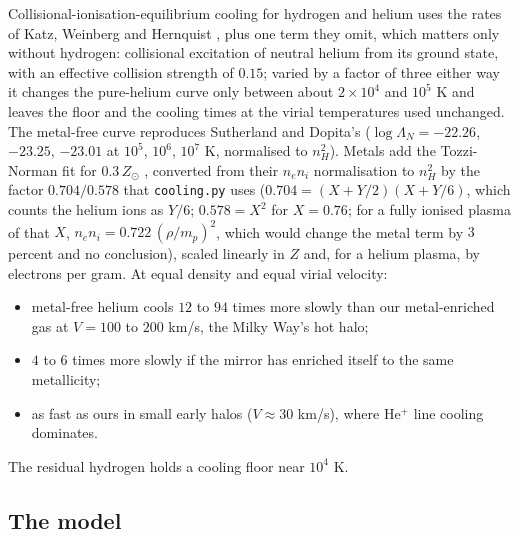 \documentclass[11pt]{article}
\theoremstyle{definition}
\newcommand{\file}[1]{\texttt{#1}}
\begin{document}
Collisional-ionisation-equilibrium cooling for hydrogen and helium uses the rates of Katz, Weinberg and Hernquist \cite{KWH1996}, plus one term they omit, which matters only without hydrogen: collisional excitation of neutral helium from its ground state, with an effective collision strength of $0.15$; varied by a factor of three either way it changes the pure-helium curve only between about $2 \times 10^{4}$ and $10^{5}$ K and leaves the floor and the cooling times at the virial temperatures used unchanged. The metal-free curve reproduces Sutherland and Dopita's \cite{SutherlandDopita1993} ($\log\Lambda_{N} = -22.26$, $-23.25$, $-23.01$ at $10^{5}$, $10^{6}$, $10^{7}$ K, normalised to $n_{H}^{2}$). Metals add the Tozzi-Norman fit for $0.3\,Z_{\odot}$ \cite{TozziNorman2001}, converted from their $n_{e}n_{i}$ normalisation to $n_{H}^{2}$ by the factor $0.704/0.578$ that \file{cooling.py} uses ($0.704 = (X + Y/2)(X + Y/6)$, which counts the helium ions as $Y/6$; $0.578 = X^{2}$ for $X = 0.76$; for a fully ionised plasma of that $X$, $n_{e}n_{i} = 0.722\,(\rho/m_{p})^{2}$, which would change the metal term by $3$ percent and no conclusion), scaled linearly in $Z$ and, for a helium plasma, by electrons per gram. At equal density and equal virial velocity:
\begin{itemize}
\item metal-free helium cools $12$ to $94$ times more slowly than our metal-enriched gas at $V = 100$ to $200$ km/s, the Milky Way's hot halo;
\item $4$ to $6$ times more slowly if the mirror has enriched itself to the same metallicity;
\item as fast as ours in small early halos ($V \approx 30$ km/s), where He$^{+}$ line cooling dominates.
\end{itemize}
The residual hydrogen holds a cooling floor near $10^{4}$ K.

\subsection{The model}
\end{document}
